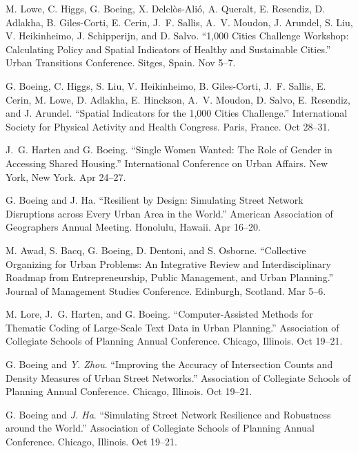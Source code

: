 \documentclass[11pt,a4paper]{report} %
\begin{document}
\begin{tablist}
\item[2024] \tab{}M. Lowe, C. Higgs, G. Boeing, X. Delclòs-Alió, A. Queralt, E. Resendiz, D. Adlakha, B. Giles-Corti, E. Cerin, J.~F. Sallis, A.~V. Moudon, J. Arundel, S. Liu, V. Heikinheimo, J. Schipperijn, and D. Salvo. \enquote{1,000 Cities Challenge Workshop: Calculating Policy and Spatial Indicators of Healthy and Sustainable Cities.} Urban Transitions Conference. Sitges, Spain. Nov 5--7.

\item[2024] \tab{}G. Boeing, C. Higgs, S. Liu, V. Heikinheimo, B. Giles-Corti, J.~F. Sallis, E. Cerin, M. Lowe, D. Adlakha, E. Hinckson, A.~V. Moudon, D. Salvo, E. Resendiz, and J. Arundel. \enquote{Spatial Indicators for the 1,000 Cities Challenge.} International Society for Physical Activity and Health Congress. Paris, France. Oct 28--31.

\item[2024] \tab{}J.~G. Harten and G. Boeing. \enquote{Single Women Wanted: The Role of Gender in Accessing Shared Housing.} International Conference on Urban Affairs. New York, New York. Apr 24--27.

\item[2024] \tab{}G. Boeing and J. Ha. \enquote{Resilient by Design: Simulating Street Network Disruptions across Every Urban Area in the World.} American Association of Geographers Annual Meeting. Honolulu, Hawaii. Apr 16--20.

\item[2024] \tab{}M. Awad, S. Bacq, G. Boeing, D. Dentoni, and S. Osborne. \enquote{Collective Organizing for Urban Problems: An Integrative Review and Interdisciplinary Roadmap from Entrepreneurship, Public Management, and Urban Planning.} Journal of Management Studies Conference. Edinburgh, Scotland. Mar 5--6.

\item[2023] \tab{}M. Lore, J.~G. Harten, and G. Boeing. \enquote{Computer-Assisted Methods for Thematic Coding of Large-Scale Text Data in Urban Planning.} Association of Collegiate Schools of Planning Annual Conference. Chicago, Illinois. Oct 19--21.

\item[2023] \tab{}G. Boeing and \textit{Y. Zhou}. \enquote{Improving the Accuracy of Intersection Counts and Density Measures of Urban Street Networks.} Association of Collegiate Schools of Planning Annual Conference. Chicago, Illinois. Oct 19--21.

\item[2023] \tab{}G. Boeing and \textit{J. Ha}. \enquote{Simulating Street Network Resilience and Robustness around the World.} Association of Collegiate Schools of Planning Annual Conference. Chicago, Illinois. Oct 19--21.


\end{tablist}
\end{document}
